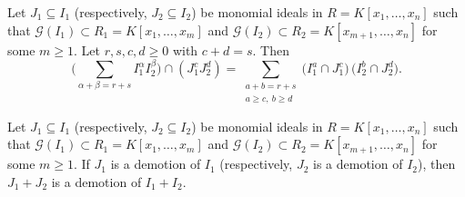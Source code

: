 \documentclass[10pt,a4paper]{amsart}
\begin{document}
\begin{lemma} \label{LEM.SUM1}
Let $J_1 \subseteq I_1$ (respectively,  $J_2 \subseteq I_2$)  be monomial ideals  in $R=K[x_1, \ldots, x_n]$ such that 
$\mathcal{G}(I_1) \subset R_1=K[x_1, \ldots, x_m]$ and $\mathcal{G}(I_2) \subset R_2=K[x_{m+1}, \ldots, x_n]$ for some $m \geq 1$. 
Let $r,s,c,d\geq 0$ with $c+d=s$. Then 
\[
\Big(\sum_{\alpha+\beta=r+s} I_1^\alpha I_2^\beta\Big)\cap (J_1^cJ_2^d)
=
\sum_{\substack{a+b=r+s\\ a\ge c,\ b\ge d}}
\big(I_1^{a}\cap J_1^c\big)\,\big(I_2^{b}\cap J_2^d\big).
\]
\end{lemma}

\begin{proposition} \label{Summation}
 Let $J_1 \subseteq I_1$ (respectively,  $J_2 \subseteq I_2$)  be monomial ideals  in $R=K[x_1, \ldots, x_n]$ such that 
$\mathcal{G}(I_1) \subset R_1=K[x_1, \ldots, x_m]$ and $\mathcal{G}(I_2) \subset R_2=K[x_{m+1}, \ldots, x_n]$ for some $m \geq 1$. 
 If  $J_1$ is  a demotion of $I_1$ (respectively,  $J_2$ is  a demotion of $I_2$), then   $J_1+J_2$ is  a demotion of $I_1+I_2$. 
\end{proposition}
\end{document}

